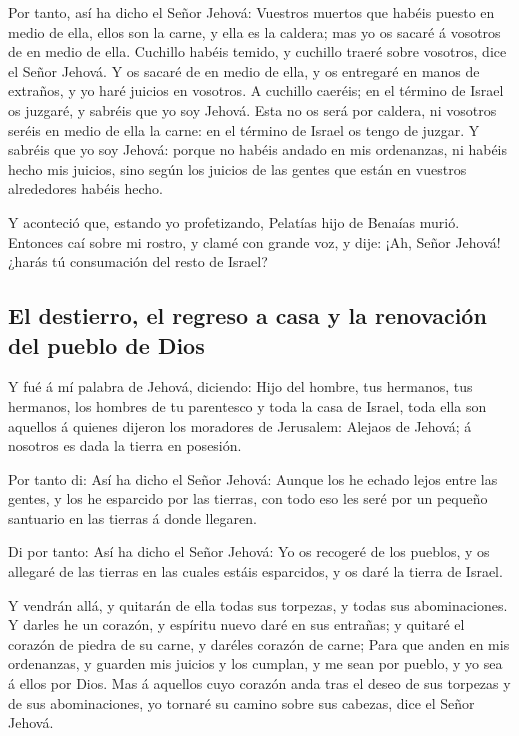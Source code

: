  Por tanto, así ha dicho el Señor Jehová: Vuestros muertos
que habéis puesto en medio de ella, ellos son la carne, y ella es la
caldera; mas yo os sacaré á vosotros de en medio de ella. 
Cuchillo habéis temido, y cuchillo traeré sobre vosotros, dice el Señor
Jehová.  Y os sacaré de en medio de ella, y os entregaré
en manos de extraños, y yo haré juicios en vosotros.  A
cuchillo caeréis; en el término de Israel os juzgaré, y sabréis que yo
soy Jehová.  Esta no os será por caldera, ni vosotros
seréis en medio de ella la carne: en el término de Israel os tengo de
juzgar.  Y sabréis que yo soy Jehová: porque no habéis
andado en mis ordenanzas, ni habéis hecho mis juicios, sino según los
juicios de las gentes que están en vuestros alrededores habéis hecho.

 Y aconteció que, estando yo profetizando, Pelatías hijo
de Benaías murió. Entonces caí sobre mi rostro, y clamé con grande voz,
y dije: ¡Ah, Señor Jehová! ¿harás tú consumación del resto de Israel?

\hypertarget{el-destierro-el-regreso-a-casa-y-la-renovaciuxf3n-del-pueblo-de-dios}{%
\subsection{El destierro, el regreso a casa y la renovación del pueblo
de
Dios}\label{el-destierro-el-regreso-a-casa-y-la-renovaciuxf3n-del-pueblo-de-dios}}

 Y fué á mí palabra de Jehová, diciendo: 
Hijo del hombre, tus hermanos, tus hermanos, los hombres de tu
parentesco y toda la casa de Israel, toda ella son aquellos á quienes
dijeron los moradores de Jerusalem: Alejaos de Jehová; á nosotros es
dada la tierra en posesión.

 Por tanto di: Así ha dicho el Señor Jehová: Aunque los
he echado lejos entre las gentes, y los he esparcido por las tierras,
con todo eso les seré por un pequeño santuario en las tierras á donde
llegaren.

 Di por tanto: Así ha dicho el Señor Jehová: Yo os
recogeré de los pueblos, y os allegaré de las tierras en las cuales
estáis esparcidos, y os daré la tierra de Israel.

 Y vendrán allá, y quitarán de ella todas sus torpezas, y
todas sus abominaciones.  Y darles he un corazón, y
espíritu nuevo daré en sus entrañas; y quitaré el corazón de piedra de
su carne, y daréles corazón de carne;  Para que anden en
mis ordenanzas, y guarden mis juicios y los cumplan, y me sean por
pueblo, y yo sea á ellos por Dios.  Mas á aquellos cuyo
corazón anda tras el deseo de sus torpezas y de sus abominaciones, yo
tornaré su camino sobre sus cabezas, dice el Señor Jehová.


